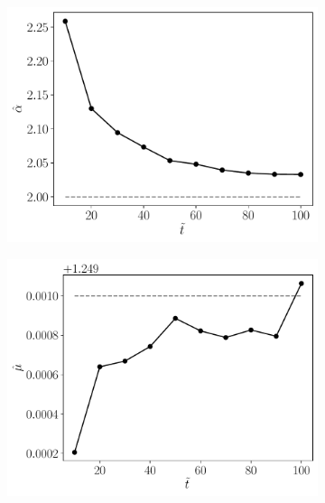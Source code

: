 \documentclass[11pt]{article}
\theoremstyle{definition}
\theoremstyle{remark}
\theoremstyle{remark}
\begin{document}
\begin{figure}
  \centering
  \begin{subfigure}[b]{0.45\textwidth}
      \centering
      \includegraphics[scale=0.45]{alphas.pdf}
      \caption{}
  \end{subfigure}
  \begin{subfigure}[b]{0.45\textwidth}
      \centering
      \includegraphics[scale=0.45]{mus.pdf}
      \caption{}
  \end{subfigure}
  \begin{subfigure}[b]{0.45\textwidth}
      \centering

\end{subfigure}
\end{figure}
\end{document}
